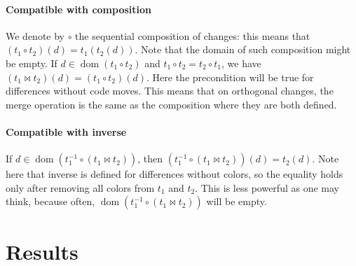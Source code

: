 \documentclass[a4paper,11pt]{article}
\newcommand\merge{\mathbin{\Join}}
\DeclareMathOperator\dom{dom}
\begin{document}
\paragraph{Compatible with composition}
We denote by $\circ$ the sequential composition of changes: this means that
$(t_1 \circ t_2)(d) = t_1(t_2(d))$. Note that the domain of such composition
might be empty.
If $d \in \dom(t_1 \circ t_2)$ and $t_1 \circ t_2 = t_2 \circ
t_1$, we have $(t_1 \merge t_2)(d) = (t_1 \circ t_2)(d)$. Here the
precondition will be true for differences without code moves. This
means that on orthogonal changes, the merge operation is the same as
the composition where they are both defined.

\paragraph{Compatible with inverse}
If $d \in \dom(t_1^{-1} \circ (t_1 \merge t_2))$, then $(t_1^{-1}
\circ (t_1 \merge t_2))(d) = t_2(d)$. Note here that inverse is
defined for differences without colors, so the equality holds only
after removing all colors from $t_1$ and $t_2$. This is less powerful as one may
think, because often, $\dom(t_1^{-1} \circ (t_1 \merge t_2))$ will be empty.

\section{Results}
\resultstable
{}
\end{document}
